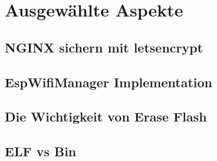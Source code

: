 \chapter{Ausgewählte Aspekte}

\section{NGINX sichern  mit letsencrypt}

\section{EspWifiManager Implementation}

\section{Die Wichtigkeit von Erase Flash}

\section{ELF vs Bin}